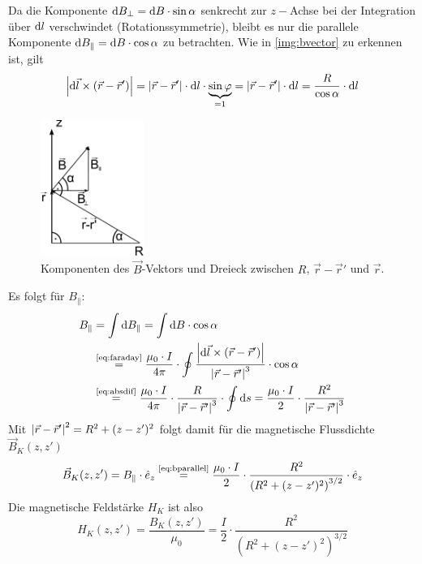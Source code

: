 Da die Komponente $\mathrm{d} B_\perp = \mathrm{d} B \cdot \sin \alpha$ senkrecht zur $z-$Achse bei der Integration über $\mathrm{d} l$ verschwindet 
(Rotationssymmetrie), bleibt es nur die parallele Komponente $\mathrm{d} B_\parallel = \mathrm{d} B \cdot \cos \alpha$ zu betrachten. Wie in 
\autoref{img:bvector} zu erkennen ist, gilt
\begin{equation}
\label{eq:absdif}
  \left|\mathrm{d} \vec{l} \times \left( \vec{r} - \vec{r}' \right)\right| = \left|\vec{r} - \vec{r}'\right| \cdot \mathrm{d} l \cdot \underbrace{\sin \varphi}_{= 1} 
  = \left|\vec{r} - \vec{r}'\right| \cdot \mathrm{d} l = \frac{R}{\cos \alpha} \cdot \mathrm{d} l
\end{equation}
\begin{figure}[H]
\begin{center}
  \includegraphics[width=0.3\textwidth]{../img/bvector.pdf}
  \caption{Komponenten des $\vec{B}$-Vektors und Dreieck zwischen $R$, $\vec{r}-\vec{r}'$ und $\vec{r}$.}
  \label{img:bvector}
\end{center}
\end{figure}
Es folgt für $B_\parallel$:
\begin{equation}
\begin{split}
  \label{eq:bparallel}
    B_\parallel &= \int \difd B_\parallel = \int \difd B \cdot \cos \alpha \\
  &\refeq{eq:faraday} \frac{\mu_0 \cdot I}{4 \pi} \cdot \oint \frac{\abs{\difd \vec{l} \times \left( \vec{r} - \vec{r}' \right)}}{\abs{\vec{r} - \vec{r}'}^3} \cdot \cos \alpha \\
  &\refeq{eq:absdif} \frac{\mu_0 \cdot I}{4 \pi} \cdot \frac{R}{\abs{\vec{r} - \vec{r}'}^3} \cdot \oint \difd s = \frac{\mu_0 \cdot I}{2} \cdot \frac{R^2}{\abs{\vec{r} - \vec{r}'}^3}
\end{split}
\end{equation}
Mit $\left|\vec{r} - \vec{r}'\right|^2 = R^2 + (z-z')^2$ folgt damit für die magnetische Flussdichte $\vec{B}_K(z, z')$
\begin{equation}
  \vec{B}_K(z, z') = B_\parallel \cdot \hat{e}_z \refeq{eq:bparallel} \frac{\mu_0 \cdot I}{2} \cdot \frac{R^2}{ \left( R^2 + (z-z')^2 \right)^{3/2}} \cdot \hat{e}_z
\end{equation}
Die magnetische Feldstärke $H_K$ ist also
\begin{equation}
  H_K(z, z') = \frac{B_K(z, z')}{\mu_0} = \frac{I}{2} \cdot \frac{R^2}{ \left( R^2 + (z-z')^2 \right)^{3/2}}
\end{equation}
